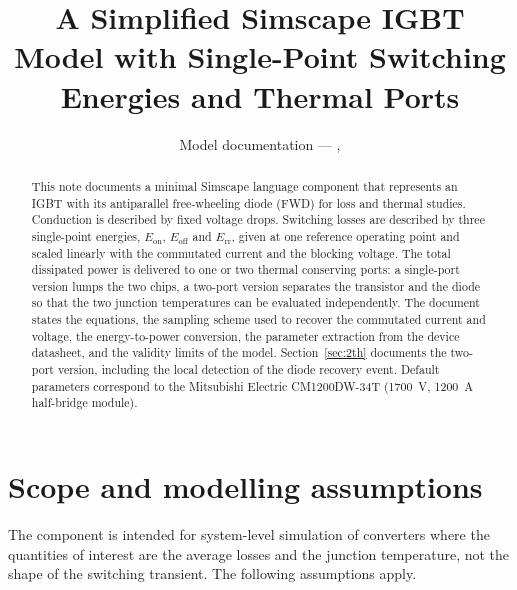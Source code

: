 \documentclass[11pt,a4paper]{article}
\title{A Simplified Simscape IGBT Model with Single-Point Switching
Energies and Thermal Ports}
\author{Model documentation --- \code{igbt\_simple.ssc},
\code{igbt\_simple\_2th.ssc}}
\date{}
\begin{document}
\maketitle

\begin{abstract}
\noindent
This note documents a minimal Simscape language component that represents an
IGBT with its antiparallel free-wheeling diode (FWD) for loss and thermal
studies. Conduction is described by fixed voltage drops. Switching losses are
described by three single-point energies, $E_\mathrm{on}$, $E_\mathrm{off}$ and
$E_\mathrm{rr}$, given at one reference operating point and scaled linearly with
the commutated current and the blocking voltage. The total dissipated power is
delivered to one or two thermal conserving ports: a single-port version lumps
the two chips, a two-port version separates the transistor and the diode so
that the two junction temperatures can be evaluated independently. The document states the equations, the
sampling scheme used to recover the commutated current and voltage, the
energy-to-power conversion, the parameter extraction from the device datasheet,
and the validity limits of the model. Section~\ref{sec:2th} documents the two-port version, including the
local detection of the diode recovery event. Default parameters correspond to
the Mitsubishi Electric CM1200DW-34T (\SI{1700}{\volt}, \SI{1200}{\ampere}
half-bridge module).
\end{abstract}

\section{Scope and modelling assumptions}

The component is intended for system-level simulation of converters where the
quantities of interest are the average losses and the junction temperature, not
the shape of the switching transient. The following assumptions apply.
\end{document}

